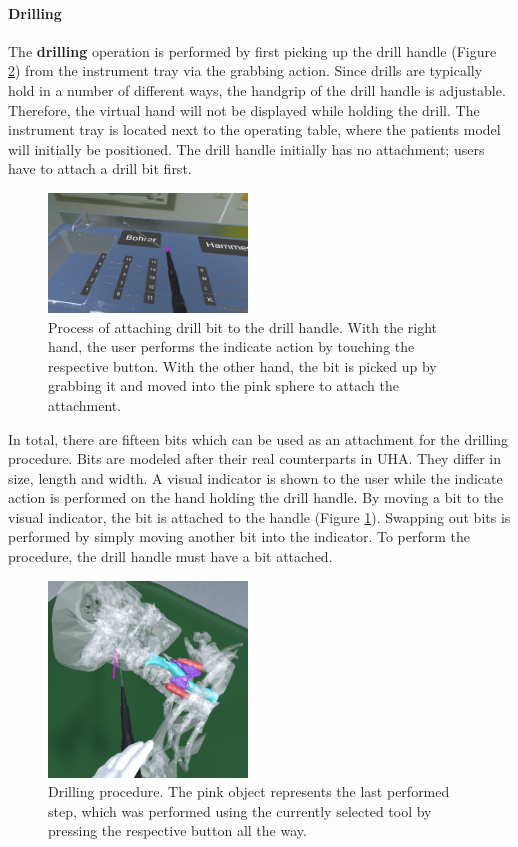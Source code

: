 \paragraph{Drilling}

The \textbf{drilling} operation is performed by first picking up the drill handle (Figure \ref{fig::FeatureDrilling}) from the instrument tray via the grabbing action.
Since drills are typically hold in a number of different ways, the handgrip of the drill handle is adjustable.
Therefore, the virtual hand will not be displayed while holding the drill.
The instrument tray is located next to the operating table, where the patients model will initially be positioned.
The drill handle initially has no attachment; users have to attach a drill bit first.

\begin{figure}[ht]
    \centering
    \includegraphics[width=200px]{images/implementation/features/procedures/drilling_attachment.png}
    \caption{\label{fig::FeatureDrillingAttachments}Process of attaching drill bit to the drill handle. With the right hand, the user performs the indicate action by touching 
    the respective button. With the other hand, the bit is picked up by grabbing it and moved into the pink sphere to attach the attachment.}
\end{figure}

In total, there are fifteen bits which can be used as an attachment for the drilling procedure.
Bits are modeled after their real counterparts in UHA.
They differ in size, length and width.
A visual indicator is shown to the user while the indicate action is performed on the hand holding the drill handle.
By moving a bit to the visual indicator, the bit is attached to the handle (Figure \ref{fig::FeatureDrillingAttachments}).
Swapping out bits is performed by simply moving another bit into the indicator.
To perform the procedure, the drill handle must have a bit attached. 

\begin{figure}[ht]
    \centering
    \includegraphics[width=200px]{images/implementation/features/procedures/drilling.png}
    \caption{\label{fig::FeatureDrilling}Drilling procedure. The pink object represents the last performed step, which was performed using the currently selected tool by pressing 
    the respective button all the way.}
\end{figure}

